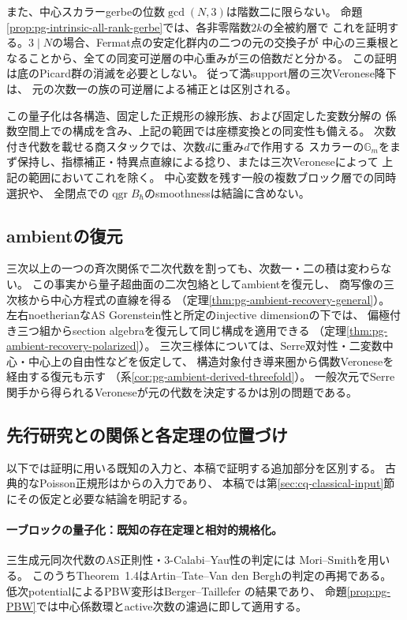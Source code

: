 また、中心スカラーgerbeの位数$\gcd(N,3)$は階数二に限らない。
命題\ref{prop:pg-intrinsic-all-rank-gerbe}では、各非零階数$2k$の全被約層で
これを証明する。$3\mid N$の場合、Fermat点の安定化群内の二つの元の交換子が
中心の三乗根となることから、全ての同変可逆層の中心重みが三の倍数だと分かる。
この証明は底のPicard群の消滅を必要としない。
従って満support層の三次Veronese降下は、
元の次数一の族の可逆層による補正とは区別される。

この量子化は各構造、固定した正規形の線形族、および固定した変数分解の
係数空間上での構成を含み、上記の範囲では座標変換との同変性も備える。
次数付き代数を載せる商スタックでは、次数$d$に重み$d$で作用する
スカラーの$\mathbb G_m$をまず保持し、指標補正・特異点直線による捻り、または三次Veroneseによって
上記の範囲においてこれを除く。
中心変数を残す一般の複数ブロック層での同時選択や、
全閉点での$\operatorname{qgr}B_\hbar$のsmoothnessは結論に含めない。

\subsection*{ambientの復元}
三次以上の一つの斉次関係で二次代数を割っても、次数一・二の積は変わらない。
この事実から量子超曲面の二次包絡としてambientを復元し、
商写像の三次核から中心方程式の直線を得る
（定理\ref{thm:pg-ambient-recovery-general}）。
左右noetherianなAS Gorenstein性と所定のinjective dimensionの下では、
偏極付き三つ組からsection algebraを復元して同じ構成を適用できる
（定理\ref{thm:pg-ambient-recovery-polarized}）。
三次三様体については、Serre双対性・二変数中心・中心上の自由性などを仮定して、
構造対象付き導来圏から偶数Veroneseを経由する復元も示す
（系\ref{cor:pg-ambient-derived-threefold}）。
一般次元でSerre関手から得られるVeroneseが元の代数を決定するかは別の問題である。


\subsection*{先行研究との関係と各定理の位置づけ}
以下では証明に用いる既知の入力と、本稿で証明する追加部分を区別する。
古典的なPoisson正規形は\cite{PoissonCubic}からの入力であり、
本稿では第\ref{sec:cq-classical-input}節にその仮定と必要な結論を明記する。

\paragraph{一ブロックの量子化：既知の存在定理と相対的規格化。}
三生成元同次代数のAS正則性・3-Calabi--Yau性の判定には
Mori--Smith\cite[Theorems~1.4, 4.2]{PMoriSmith}を用いる。
このうちTheorem~1.4はArtin--Tate--Van den Berghの判定の再掲である。
低次potentialによるPBW変形はBerger--Taillefer
\cite[Theorem~1.1(i), p.~242]{PBergerTaillefer}の結果であり、
命題\ref{prop:pg-PBW}では中心係数環とactive次数の濾過に即して適用する。

